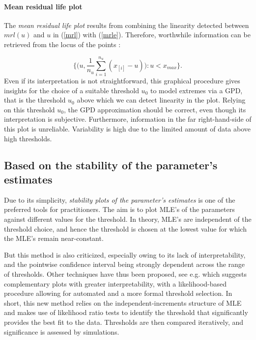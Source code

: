 \paragraph*{Mean residual life plot} 
The \emph{mean residual life plot} results from combining the linearity detected between $mrl(u)$ and $u$ in (\ref{mrl}) with (\ref{mrle}). Therefore, worthwhile information can be retrieved from the locus of the points : 

\begin{equation}
\Bigg\{\bigg(u,\frac{1}{n_u}\sum_{i=1}^{n_u}(x_{[i]}-u)\bigg):u<x_{max}\Bigg\}.
\end{equation}
Even if its interpretation is not straightforward, this graphical procedure gives insights for the choice of a suitable threshold $u_0$ to model extremes via a GPD, that is the threshold $u_0$ above which we can detect linearity in the plot. Relying on this threshold $u_0$, the GPD approximation should be correct, even though its interpretation is subjective. Furthermore, information in the far right-hand-side of this plot is unreliable. Variability is high due to the limited amount of data above high thresholds. %



\subsection*{Based on the stability of the parameter's estimates}


Due to its simplicity,  \textit{stability plots of the parameter's estimates} is one of the preferred tools for practitioners.
The aim is to plot MLE's of the parameters against different values for the threshold. In theory, MLE's are independent of the threshold choice, and hence the threshold is chosen at the lowest value for which the MLE's remain near-constant. 

But this method is also criticized, especially owing to its lack of interpretability, and the pointwise confidence interval being strongly dependent across the range of thresholds.
Other techniques have thus been proposed, see e.g. \citet{Wadsworth_exploiting_2016} which suggests complementary plots with greater interpretability, with a likelihood-based procedure allowing for automated and a more formal threshold selection.
In short, this new method relies on the independent-increments
structure of MLE and makes use of likelihood ratio tests to identify the threshold that significantly provides the best fit to the data. Thresholds are then compared iteratively, and significance is assessed by simulations.


